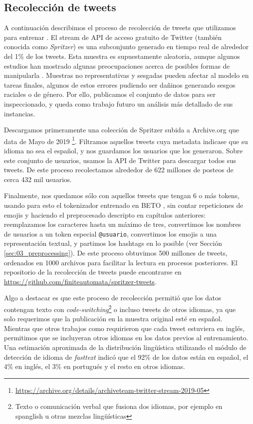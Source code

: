 \subsection{Recolección de tweets}

\label{sec:robertuito_data_collection}

A continuación describimos el proceso de recolección de tweets que utilizamos para entrenar \robertuito{}. El stream de API de acceso gratuito de Twitter (también conocida como \emph{Spritzer}) es una subconjunto generado en tiempo real de alrededor del 1\% de los tweets. Esta muestra es supuestamente aleatoria, aunque algunos estudios han mostrado algunas preocupaciones acerca de posibles formas de manipularla \cite{pfeffer2018tampering}. Muestras no representativas y sesgadas pueden afectar al modelo en tareas finales, algunos de estos errores pudiendo ser dañinos generando sesgos raciales o de género. Por ello, publicamos el conjunto de datos para ser inspeccionado, y queda como trabajo futuro un análisis más detallado de sus instancias.

Descargamos primeramente una colección de Spritzer subida a Archive.org que data de Mayo de 2019 \footnote{\url{https://archive.org/details/archiveteam-twitter-stream-2019-05}}. Filtramos aquellos tweets cuya metadata indicase que su idioma no sea el español, y nos guardamos los usuarios que los generaron. Sobre este conjunto de usuarios, usamos la API de Twitter para descargar todos sus tweets. De este proceso recolectamos alrededor de 622 millones de posteos de cerca 432 mil usuarios.

Finalmente, nos quedamos sólo con aquellos tweets que tengan 6 o más tokens, usando para esto el tokenizador entrenado en BETO \cite{canete2020spanish}, sin contar repeticiones de emojis y haciendo el preprocesado descripto en capítulos anteriores: reemplazamos los caracteres hasta un máximo de tres, convertimos los nombres de usuarios a un token especial \verb|@usuario|, convertimos los emojis a una representación textual, y partimos los hashtags en lo posible (ver Sección \ref{sec:03_preprocessing}). De este proceso obtuvimos 500 millones de tweets, ordenados en \num{1000} archivos para facilitar la lectura en procesos posteriores. El repositorio de la recolección de tweets puede encontrarse en \url{https://github.com/finiteautomata/spritzer-tweets}.

Algo a destacar es que este proceso de recolección permitió que los datos contengan texto con \emph{code-switching}\footnote{Texto o comunicación verbal que fusiona dos idiomas, por ejemplo en spanglish u otras mezclas lingüísticas} o incluso tweets de otros idiomas, ya que solo requerimos que la publicación en la muestra original esté en español. Mientras que otros trabajos como \citet{dat2020bertweet} requirieron que cada tweet estuviera en inglés, permitimos que se incluyeran otros idiomas en los datos previos al entrenamiento. Una estimación aproximada de la distribución lingüística utilizando el módulo de detección de idioma de \emph{fasttext} \cite{joulin2017bag} indicó que el 92\% de los datos están en español, el 4\% en inglés, el 3\% en portugués y el resto en otros idiomas.


